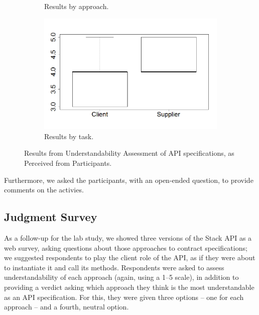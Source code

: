 \begin{figure}
\begin{subfigure}{.33\textwidth}
\caption{Results by approach.}
\label{fig:approachesEmpirical}
\end{subfigure}
\begin{subfigure}{.33\textwidth}
\includegraphics[width=1\linewidth]{figs/boxplotTasksEmpiricalStudy}
\caption{Results by task.}
\label{fig:tasksEmpirical}
\end{subfigure}
\caption{Results from Understandability Assessment of API specifications, as Perceived from Participants.}
\label{fig:empiricalResults}
\end{figure}


Furthermore, we asked the participants, with an open-ended question, to provide comments on the activies.






\subsection{Judgment Survey}
\label{sec:surveyResults}

As a follow-up for the lab study, we showed three versions of the Stack API as a web survey, asking questions about those approaches to contract specifications; we suggested respondents to play the client role of the API, as if they were about to instantiate it and call its methods.
Respondents were asked to assess understandability of each approach (again, using a 1--5 scale), in addition to providing a verdict asking which approach they think is the most understandable as an API specification. For this, they were given three options -- one for each approach -- and a fourth, neutral option.

